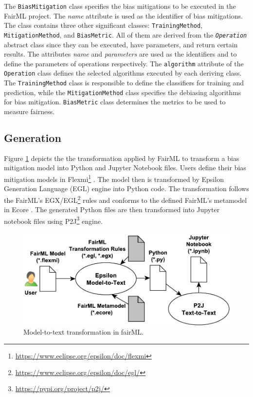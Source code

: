 \documentclass[sigconf,review]{acmart}
\begin{document}
The \texttt{BiasMitigation} class specifies the bias mitigations to be executed in the FairML project. The \textit{name} attribute is used as the identifier of bias mitigations. The class contains three other significant classes: \texttt{TrainingMethod}, \texttt{MitigationMethod}, and \texttt{BiasMetric}. All of them are derived from the \texttt{\textit{Operation}} abstract class since they can be executed, have parameters, and return certain results. The attributes \textit{name} and \textit{parameters} are used as the identifiers and to define the parameters of operations respectively. The \texttt{algorithm} attribute of the \texttt{Operation} class defines the selected algorithms executed by each deriving class. The \texttt{TrainingMethod} class is responsible to define the classifiers for training and prediction, while the \texttt{MitigationMethod} class specifies the debiasing algorithms for bias mitigation. \texttt{BiasMetric} class determines the metrics to be used to measure fairness. 


\subsection{Generation}
\label{sec:generation}

Figure \ref{fig:transformation} depicts the the transformation applied by FairML to transform a bias mitigation model into Python and Jupyter Notebook files. Users define their bias mitigation models in Flexmi\footnote{\url{https://www.eclipse.org/epsilon/doc/flexmi}} \cite{dimitris2016flexmi}. The model then is transformed by Epsilon Generation Language (EGL) \cite{rose2008egl} engine into Python code. The transformation follows the FairML's EGX/EGL\footnote{\url{https://www.eclipse.org/epsilon/doc/egl/}} rules and conforms to the defined FairML's metamodel in Ecore \cite{steinberg2009emf}. The generated Python files are then transformed into Jupyter notebook files using P2J\footnote{\url{https://pypi.org/project/p2j/}} engine.

\begin{figure}
	\includegraphics[width=\linewidth]{figures/transformation}
	\caption{Model-to-text transformation in fairML.}
	\label{fig:transformation}
\end{figure}
\end{document}
